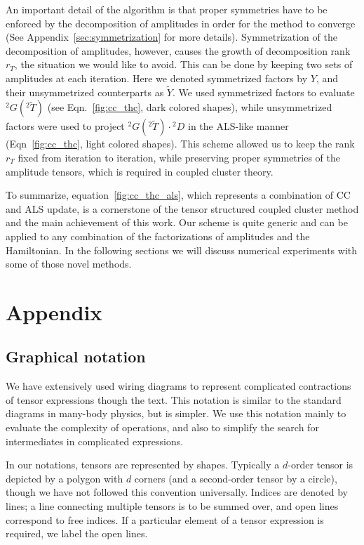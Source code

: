 An important detail of the algorithm is that proper symmetries have to be 
enforced by the decomposition of amplitudes in order for 
the method to converge (See Appendix~\ref{sec:symmetrization} for more 
details). Symmetrization of the decomposition of amplitudes, however, causes 
the growth of decomposition rank $r_{T}$, the situation we would like 
to avoid. This can be done by keeping two sets of amplitudes at each 
iteration. Here we denoted symmetrized factors by $Y$, and their 
unsymmetrized counterparts as $\tilde{Y}$. We used symmetrized factors to 
evaluate ${}^2G({}^2 \tilde{T})$ (see Eqn.~\ref{fig:cc_thc}, dark colored 
shapes), while unsymmetrized factors were used to project ${}^2G({}^2 
\tilde{T}) \cdot {}^2D$ in the ALS-like manner (Eqn~\ref{fig:cc_thc}, light 
colored shapes). This scheme allowed us to keep the rank 
$r_{T}$ fixed from iteration to iteration, while preserving proper symmetries of 
the amplitude tensors, which is required in coupled cluster theory. 

To summarize, equation~\ref{fig:cc_thc_als}, which represents a combination 
of CC and ALS update, is a cornerstone of the tensor structured coupled cluster 
method and the main achievement of this work. Our scheme is quite generic  
and can be applied to any combination of the factorizations of amplitudes and 
the Hamiltonian. In the following sections we will discuss numerical experiments 
with some of those novel methods.


\section{Appendix
\label{sec:Appendix}}
\subsection{Graphical notation
\label{sec:graphical_notation}}
We have extensively used wiring diagrams to represent complicated contractions 
of tensor expressions though the text. This notation is similar to the standard 
diagrams in many-body physics,\cite{mattuck2012guide} but is simpler. We use 
this notation mainly to evaluate the complexity of operations, and also to 
simplify the search for intermediates in complicated expressions.  

In our notations, tensors are represented by shapes.  Typically a
$d$-order tensor is depicted by a polygon with $d$ corners (and a
second-order tensor by a circle), though we have not followed this
convention universally. Indices are denoted by lines; a line
connecting multiple tensors is to be summed over, and open lines
correspond to free indices. If a particular element of a tensor
expression is required, we label the open lines.

